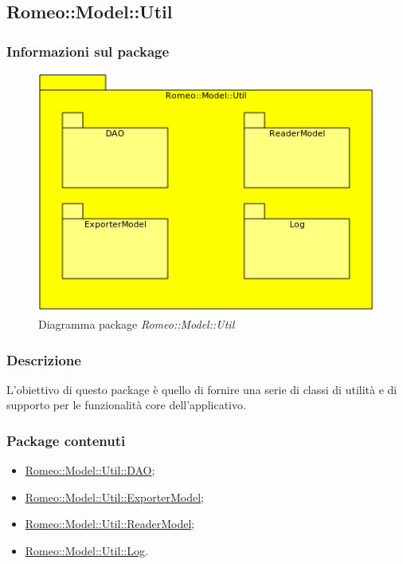 				
			\pagebreak


	\subsection{Romeo::Model::Util}
	\label{romeo::model::util}
	\subsubsection{Informazioni sul package}
		\label{info_util}
		\begin{figure}[!h]
			\centering
			\includegraphics[width=0.8\linewidth]{./Content/Immagini/Romeo__Model__Util.png}
			\caption{Diagramma package \textsl{Romeo::Model::Util}}
			\label{comp_romeo::model::util}
		\end{figure}

		\subsubsection{Descrizione}
		\label{descr_util}
		L'obiettivo di questo package\glossario{} è quello di fornire una serie di classi di utilità e di supporto per le funzionalità core dell'applicativo.
		\subsubsection{Package contenuti}
		\label{pack_util}
		\begin{itemize}
			\item \hyperref[romeo::model::util::dao]{Romeo::Model::Util::DAO};
			\item \hyperref[romeo::model::util::exportermodel]{Romeo::Model::Util::ExporterModel};
\item \hyperref[romeo::model::util::readermodel]{Romeo::Model::Util::ReaderModel};
			\item \hyperref[romeo::model::util::log]{Romeo::Model::Util::Log}.
		\end{itemize}
\pagebreak
